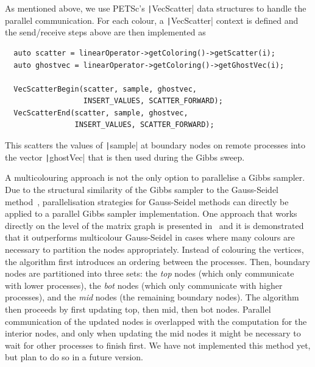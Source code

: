 \documentclass[
fontsize=11pt,
paper=a4,
numbers=noenddot
]{scrartcl}
\begin{document}
As mentioned above, we use PETSc's \texttt|VecScatter| data structures to handle the parallel communication. For each colour, a \texttt|VecScatter| context is defined and the send/receive steps above are then implemented as
\begin{verbatim}
  auto scatter = linearOperator->getColoring()->getScatter(i);
  auto ghostvec = linearOperator->getColoring()->getGhostVec(i);

  VecScatterBegin(scatter, sample, ghostvec, 
                  INSERT_VALUES, SCATTER_FORWARD);
  VecScatterEnd(scatter, sample, ghostvec, 
                INSERT_VALUES, SCATTER_FORWARD);
\end{verbatim}
This scatters the values of \texttt|sample| at boundary nodes on remote processes into the vector \texttt|ghostVec| that is then used during the Gibbs sweep. 

A multicolouring approach is not the only option to parallelise a Gibbs sampler. Due to the structural similarity of the Gibbs sampler to the Gauss-Seidel method~\cite{goodmansokal,foxparker}, parallelisation strategies for Gauss-Seidel methods can directly be applied to a parallel Gibbs sampler implementation. One approach that works directly on the level of the matrix graph is presented in~\cite{adams2001} and it is demonstrated that it outperforms multicolour Gauss-Seidel in cases where many colours are necessary to partition the nodes appropriately. Instead of colouring the vertices, the algorithm first introduces an ordering between the processes. Then, boundary nodes are partitioned into three sets: the \emph{top} nodes (which only communicate with lower processes), the \emph{bot} nodes (which only communicate with higher processes), and the \emph{mid} nodes (the remaining boundary nodes). The algorithm then proceeds by first updating top, then mid, then bot nodes. Parallel communication of the updated nodes is overlapped with the computation for the interior nodes, and only when updating the mid nodes it might be necessary to wait for other processes to finish first. We have not implemented this method yet, but plan to do so in a future version.
\end{document}
